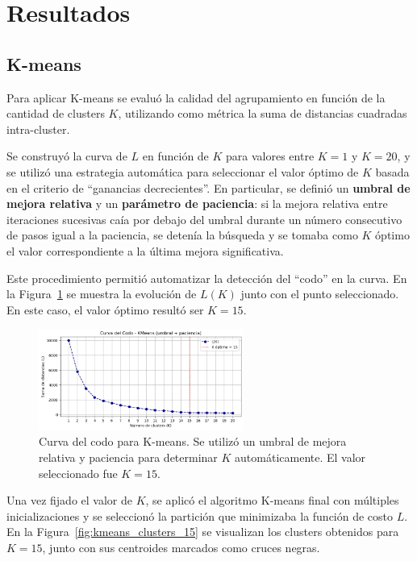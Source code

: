 \documentclass[11pt]{article}
\begin{document}
\section{Resultados}
\subsection*{K-means}

Para aplicar K-means se evaluó la calidad del agrupamiento en función de la cantidad de clusters $K$, utilizando como métrica la suma de distancias cuadradas intra-cluster. 

Se construyó la curva de $L$ en función de $K$ para valores entre $K=1$ y $K=20$, y se utilizó una estrategia automática para seleccionar el valor óptimo de $K$ basada en el criterio de “ganancias decrecientes”. En particular, se definió un \textbf{umbral de mejora relativa} y un \textbf{parámetro de paciencia}: si la mejora relativa entre iteraciones sucesivas caía por debajo del umbral durante un número consecutivo de pasos igual a la paciencia, se detenía la búsqueda y se tomaba como $K$ óptimo el valor correspondiente a la última mejora significativa.

Este procedimiento permitió automatizar la detección del “codo” en la curva. En la Figura~\ref{fig:kmeans_elbow_auto} se muestra la evolución de $L(K)$ junto con el punto seleccionado. En este caso, el valor óptimo resultó ser $K = 15$.

\begin{figure}[H]
    \centering
    \includegraphics[width=0.6\textwidth]{figures/kmeans_elbow_threshold.png}
    \caption{Curva del codo para K-means. Se utilizó un umbral de mejora relativa y paciencia para determinar $K$ automáticamente. El valor seleccionado fue $K = 15$.}
    \label{fig:kmeans_elbow_auto}
\end{figure}

Una vez fijado el valor de $K$, se aplicó el algoritmo K-means final con múltiples inicializaciones y se seleccionó la partición que minimizaba la función de costo $L$. En la Figura~\ref{fig:kmeans_clusters_15} se visualizan los clusters obtenidos para $K = 15$, junto con sus centroides marcados como cruces negras.
\end{document}
